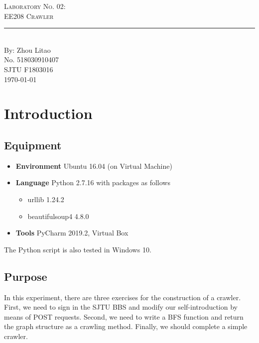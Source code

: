 \documentclass{article}
\newcommand{\labno}{02}
\newcommand{\labtitle}{EE208 Crawler}
\newcommand{\authorname}{Zhou Litao}
\newcommand{\studentno}{518030910407}
\newcommand{\classno}{F1803016}
\begin{document}
\begin{center}
{\LARGE \textsc{Laboratory No. \labno:} \\ \vspace{4pt}}
{\Large \textsc{\labtitle} \\ \vspace{4pt}} 
\rule[13pt]{\textwidth}{1pt} \\ \vspace{15pt}
{\large By: \authorname \\ \vspace{10pt}
No. \studentno \\ \vspace{10pt}
SJTU \classno \\ \vspace{10pt}
\today \vspace{20pt}}
\end{center}



\section{Introduction}

\subsection{Equipment}
\begin{itemize}
\item\textbf{Environment} Ubuntu 16.04 (on Virtual Machine)
\item\textbf{Language} Python 2.7.16 with packages as follows
	\begin{itemize}
	\item urllib 1.24.2
	\item beautifulsoup4 4.8.0
	\end{itemize}
\item\textbf{Tools} PyCharm 2019.2, Virtual Box
\end{itemize}
The Python script is also tested in Windows 10.

\subsection{Purpose}
In this experiment, there are three exercises for the construction of a crawler. First, we need to sign in the SJTU BBS and modify our self-introduction by means of POST requests. Second, we need to write a BFS function and return the graph structure as a crawling method. Finally, we should complete a simple crawler.
\end{document}
